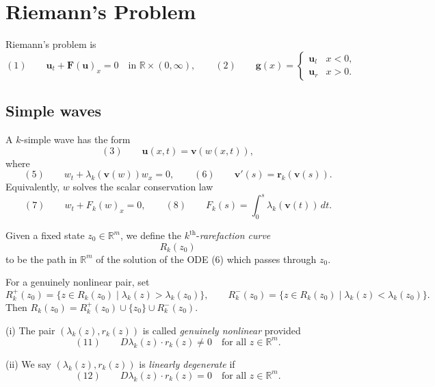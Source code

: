 \section{Riemann's Problem}\label{sec:riemanns-problem}

Riemann's problem is
\[
(1)\qquad \mathbf u_t+\mathbf F(\mathbf u)_x=0
\quad\text{in }\mathbb R\times(0,\infty),
\qquad
(2)\qquad
\mathbf g(x)=
\begin{cases}
\mathbf u_l & x<0,\\
\mathbf u_r & x>0.
\end{cases}
\]

\subsection{Simple waves}\label{sec:simple-waves}

A $k$-simple wave has the form
\[
(3)\qquad \mathbf u(x,t)=\mathbf v(w(x,t)),
\]
where
\[
(5)\qquad w_t+\lambda_k(\mathbf v(w))w_x=0,
\qquad
(6)\qquad \mathbf v'(s)=\mathbf r_k(\mathbf v(s)).
\]
Equivalently, $w$ solves the scalar conservation law
\[
(7)\qquad w_t+F_k(w)_x=0,
\qquad
(8)\qquad F_k(s)=\int_0^s\lambda_k(\mathbf v(t))\,dt.
\]

\begin{definition}
\label{def:rarefaction-curve}

Given a fixed state $z_0\in\mathbb{R}^m$, we define the $k^{\text{th}}$-\textit{rarefaction curve}
$$R_k(z_0)$$
to be the path in $\mathbb{R}^m$ of the solution of the ODE (6) which passes through $z_0$.
\end{definition}

For a genuinely nonlinear pair, set
\[
R_k^+(z_0)=\{z\in R_k(z_0)\mid\lambda_k(z)>\lambda_k(z_0)\},
\qquad
R_k^-(z_0)=\{z\in R_k(z_0)\mid\lambda_k(z)<\lambda_k(z_0)\}.
\]
Then $R_k(z_0)=R_k^+(z_0)\cup\{z_0\}\cup R_k^-(z_0)$.

\begin{definition}
\label{def:genuinely-nonlinear-linearly-degenerate}

(i) The pair $(\lambda_k(z), r_k(z))$ is called \textit{genuinely nonlinear} provided
$$(11) \qquad D\lambda_k(z)\cdot r_k(z) \neq 0 \quad \text{for all } z\in\mathbb{R}^m.$$

(ii) We say $(\lambda_k(z), r_k(z))$ is \textit{linearly degenerate} if
$$(12) \qquad D\lambda_k(z)\cdot r_k(z) = 0 \quad \text{for all } z\in\mathbb{R}^m.$$
\end{definition}

